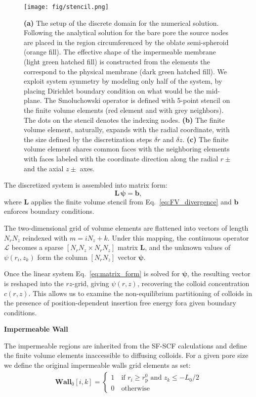 \documentclass[10pt, a4paper]{article}
\begin{document}
\begin{multicols}{2}
\begin{figure}[H]
  \texttt{[image: fig/stencil.png]}
  \caption{\textbf{(a)} The setup of the discrete domain for the numerical solution.
  Following the analytical solution for the bare pore the source nodes are placed in the region circumferenced by the oblate semi-spheroid (orange fill).
  The effective shape of the impermeable membrane (light green hatched fill) is constructed from the elements the correspond to the physical membrane (dark green hatched fill).
  We exploit system symmetry by modeling only half of the system, by placing Dirichlet boundary condition on what would be the mid-plane.
  The Smoluchowski operator is defined with 5-point stencil on the finite volume elements (red element and with grey neighbors).
  The dots on the stencil denotes the indexing nodes.
  \textbf{(b)} The finite volume element, naturally, expands with the radial coordinate, with the size defined by the discretization steps $\delta r$ and $\delta z$.
  \textbf{(c)} The finite volume element shares common faces with the neighboring elements with faces labeled with the coordinate direction along the radial $r \pm$ and the axial $z\pm$ axes.
  }
  \label{fig:stencil}
\end{figure}




The discretized system is assembled into matrix form:
\begin{equation}
  \mathbf L\, \bm{\psi}=\bm b,
  \label{eq:matrix_form}
\end{equation}
where $\mathbf{L}$ applies the finite volume stencil from Eq.~\ref{eq:FV_divergence} and $\bm b$ enforces boundary conditions.

The two-dimensional grid of volume elements are flattened into vectors of length $N_rN_z$ reindexed with $m=iN_z+k$.
Under this mapping, the continuous operator $\mathcal L$ becomes a sparse $[N_rN_z\times N_rN_z]$ matrix $\mathbf L$, and the unknown values of $\psi(r_i, z_k)$ form the column $[N_rN_z]$ vector $\bm{\psi}$.

Once the linear system Eq.~\ref{eq:matrix_form} is solved for $\bm{\psi}$, the resulting vector is reshaped into the $rz$-grid, giving $\psi(r,z)$, recovering the colloid concentration $c(r,z)$.
This allows us to examine the non-equilibrium partitioning of colloids in the presence of position-dependent insertion free energy fora given boundary conditions.

\textbf{Impermeable Wall}

The impermeable regions are inherited from the SF-SCF calculations and define the finite volume elements inaccessible to diffusing colloids.
For a given pore size we define the original impermeable walls grid elements as set:
\begin{eqnarray}
    \textbf{Wall}_{0} [i,k] = 
    \begin{cases}
        1 \quad \text{if } r_i \ge r_{\text{p}}^0 \text{ and } z_k \le -L_0/2 \\
        0 \quad \text{otherwise}
    \end{cases}
\end{eqnarray}


\end{multicols}
\end{document}
